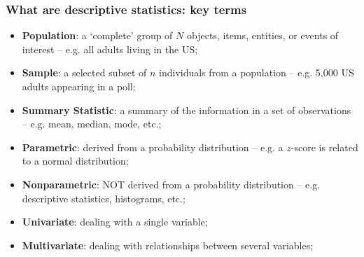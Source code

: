 \documentclass[aspectratio=169]{beamer}
\theoremstyle{principle}
\begin{document}
\begin{frame}
\frametitle{What are descriptive statistics: key terms}
\begin{itemize}
\item \textbf{Population}: a `complete' group of $N$ objects, items, entities, or events of interest -- e.g. all adults living in the US;
\bigskip
\item \textbf{Sample}: a selected subset of $n$ individuals from a population -- e.g. 5,000 US adults appearing in a poll;
\bigskip
\item \textbf{Summary Statistic}: a summary of the information in a set of observations -- e.g. mean, median, mode, etc.;
\bigskip
\item \textbf{Parametric}: derived from a probability distribution -- e.g. a $z$-score is related to a normal distribution;
\bigskip
\item \textbf{Nonparametric}: NOT derived from a probability distribution -- e.g. descriptive statistics, histograms, etc.;
\bigskip
\item \textbf{Univariate}: dealing with a single variable;
\bigskip
\item \textbf{Multivariate}: dealing with relationships between several variables;
\end{itemize}
\end{frame}
\end{document}
